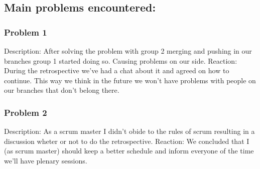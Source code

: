 \documentclass[a4paper, landscape]{article}
\begin{document}
\subsection*{Main problems encountered:}
\subsubsection*{Problem 1}
Description: After solving the problem with group 2 merging and pushing in our branches group 1 started doing so. Causing problems on our side.
Reaction: During the retrospective we've had a chat about it and agreed on how to continue. This way we think in the future we won't have problems with people on our branches that don't belong there.

\subsubsection*{Problem 2}
Description: As a scrum master I didn't obide to the rules of scrum resulting in a discussion wheter or not to do the retrospective.
Reaction: We concluded that I (as scrum master) should keep a better schedule and inform everyone of the time we'll have plenary sessions.
\end{document}
